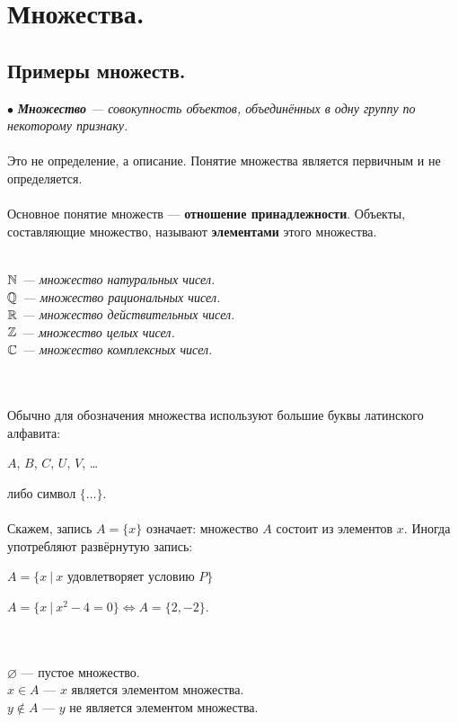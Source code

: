 	\chapter{Множества.}
\section{Примеры множеств.}
$\bullet$ \textit{\textbf{Множество} --- совокупность объектов, объединённых в одну группу по некоторому признаку.}\\\\
Это не определение, а описание. Понятие множества является первичным и не определяется.\\\\
Основное понятие множеств --- \textbf{отношение принадлежности}. Объекты, составляющие множество, называют \textbf{элементами} этого множества.\\
\begin{example}\\
	\textit{$\mathbb{N}$ --- множество натуральных чисел.\\
		$\mathbb{Q}$ --- множество рациональных чисел.\\
		$\mathbb{R}$ --- множество действительных чисел.\\
		$\mathbb{Z}$ --- множество целых чисел.\\
		$\mathbb{C}$ --- множество комплексных чисел.}
\end{example}\\\\
Обычно для обозначения множества используют большие буквы латинского алфавита:
\begin{center}
	$A$, $B$, $C$, $U$, $V$, \dots
\end{center}
либо символ $\{\dots\}$.\\\\
Скажем, запись $A=\{x\}$ означает: множество $A$ состоит из элементов $x$. Иногда употребляют развёрнутую запись:
\begin{center}
	$A=\{x\:|\: x$ удовлетворяет условию $P\}$
\end{center}
\begin{example}
	$A=\{x\:|\: x^2-4=0\} \Leftrightarrow A=\{2, -2\}$.
\end{example}\\\\
$\varnothing$ --- пустое множество.\\
$x \in A$ --- $x$ является элементом множества.\\
$y \notin A$ --- $y$ не является элементом множества.\\\\
